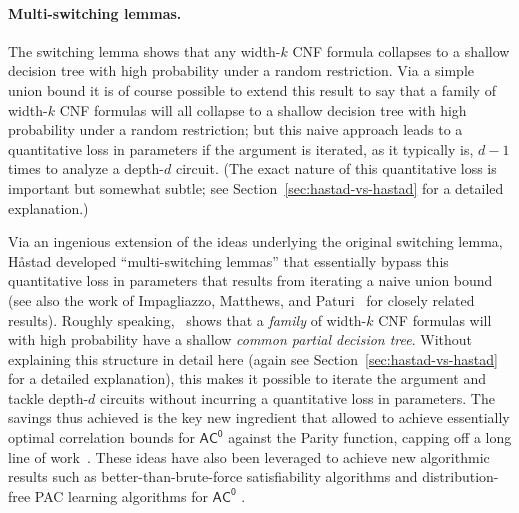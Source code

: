\documentclass{toc}
\theoremstyle{plain}
\newcommand{\acz}{\mathsf{AC^0}}
\begin{document}
\vspace{-5pt}
\paragraph{Multi-switching lemmas.}  The switching lemma shows that any width-$k$ CNF formula collapses to a shallow decision tree with high probability under a random restriction.  Via a simple union bound it is of course possible to extend this result to say that a family of width-$k$ CNF formulas will all collapse to a shallow decision tree with high probability under a random restriction; but this naive approach leads to a quantitative loss in parameters if the argument is iterated, as it typically is, $d-1$ times to analyze a depth-$d$ circuit.  (The exact nature of this quantitative loss is important but somewhat subtle; see Section~\ref{sec:hastad-vs-hastad} for a detailed explanation.)

Via an ingenious extension of the ideas underlying the original switching lemma, H{\aa}stad \cite{Has14} developed ``multi-switching lemmas'' that essentially bypass this quantitative loss in parameters that results from iterating a naive union bound (see also the work of Impagliazzo, Matthews, and Paturi~\cite{IMP12}  for closely related results).  Roughly speaking,~\cite{Has14} shows that a \emph{family} of width-$k$ CNF formulas will with high probability have a shallow \emph{common partial decision tree}.  Without explaining this structure in detail here (again see Section~\ref{sec:hastad-vs-hastad} for a detailed explanation), this makes it possible to iterate the argument and tackle depth-$d$ circuits without incurring a quantitative loss in parameters.  The savings thus achieved is the key new ingredient that allowed \cite{IMP12,Has14} to achieve essentially optimal correlation bounds for $\acz$ against the  {\sc Parity}  function, capping off a long line of work~\cite{ajtai1983,yao1985,Hastad86,Cai86,babai1987,BIS12}.  These ideas have also been leveraged to achieve new algorithmic results such as better-than-brute-force satisfiability algorithms and distribution-free PAC learning algorithms for $\acz$ \cite{BIS12,IMP12,STitcs17}.

\vspace{-5pt}
\end{document}
